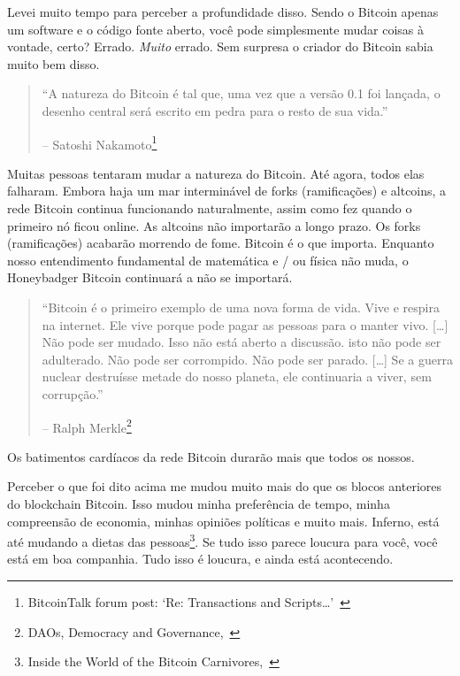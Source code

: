 Levei muito tempo para perceber a profundidade disso. Sendo o Bitcoin
apenas um software e o código fonte aberto, você pode simplesmente mudar
coisas à vontade, certo?
Errado. \textit{Muito} errado. Sem surpresa o criador do Bitcoin sabia muito bem disso.

\begin{quotation}\begin{samepage}
\enquote{A natureza do Bitcoin é tal que, uma vez que a versão 0.1 foi lançada, o desenho central será escrito em pedra para o resto de sua vida.}
\begin{flushright} -- Satoshi Nakamoto\footnote{BitcoinTalk forum post: `Re:
Transactions and Scripts\ldots'~\cite{satoshi-set-in-stone}}
\end{flushright}\end{samepage}\end{quotation}

Muitas pessoas tentaram mudar a natureza do Bitcoin. Até agora, todos
elas falharam. Embora haja um mar interminável de forks (ramificações) e altcoins,
a rede Bitcoin continua funcionando naturalmente, assim como fez quando o primeiro
nó ficou online. As altcoins não importarão a longo prazo. Os forks (ramificações)
acabarão morrendo de fome. Bitcoin é o que importa. Enquanto nosso entendimento fundamental de matemática e / ou física não muda,
o Honeybadger Bitcoin continuará a não se importará.


\begin{quotation}\begin{samepage}
\enquote{Bitcoin é o primeiro exemplo de uma nova forma de vida. Vive e
respira na internet. Ele vive porque pode pagar as pessoas para o manter
vivo. [\ldots] Não pode ser mudado. Isso não está aberto a discussão. isto
não pode ser adulterado. Não pode ser corrompido. Não pode ser parado.
[\ldots] Se a guerra nuclear destruísse metade do nosso planeta, ele continuaria
a viver, sem corrupção.}
\begin{flushright} -- Ralph Merkle\footnote{DAOs, Democracy and
Governance,~\cite{merkle-dao}}
\end{flushright}\end{samepage}\end{quotation}

Os batimentos cardíacos da rede Bitcoin durarão mais que todos os nossos.
~

Perceber o que foi dito acima me mudou muito mais do que os blocos anteriores do blockchain Bitcoin. Isso mudou minha preferência de tempo, minha compreensão de
economia, minhas opiniões políticas e muito mais. Inferno, está até mudando a
dietas das pessoas\footnote{Inside the World of the Bitcoin
Carnivores,~\cite{carnivores}}. Se tudo isso parece loucura para você, você está
em boa companhia. Tudo isso é loucura, e ainda está acontecendo.

